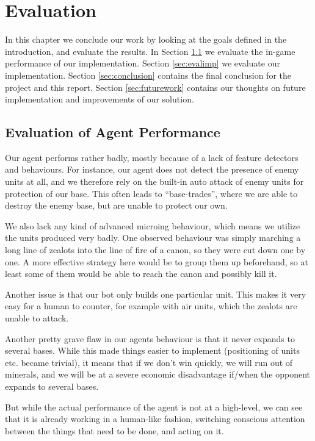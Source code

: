 
\chapter{Evaluation}
In this chapter we conclude our work by looking at the goals defined in the introduction, and evaluate the results.
In Section \ref{sec:evalperf} we evaluate the in-game performance of our implementation.
Section \ref{sec:evalimp} we evaluate our implementation.
Section \ref{sec:conclusion} contains the final conclusion for the project and this report.
Section \ref{sec:futurework} contains our thoughts on future implementation and improvements of our solution.


\section{Evaluation of Agent Performance}
\label{sec:evalperf}
Our agent performs rather badly, mostly because of a lack of feature detectors and behaviours. For instance, our agent does not detect the presence of enemy units at all, and we therefore rely on the built-in auto attack of enemy units for protection of our base. This often leads to ``base-trades'', where we are able to destroy the enemy base, but are unable to protect our own.

We also lack any kind of advanced microing behaviour, which means we utilize the units produced very badly. One observed behaviour was simply marching a long line of zealots into the line of fire of a canon, so they were cut down one by one. A more effective strategy here would be to group them up beforehand, so at least some of them would be able to reach the canon and possibly kill it.

Another issue is that our bot only builds one particular unit. This makes it very easy for a human to counter, for example with air units, which the zealots are unable to attack.

Another pretty grave flaw in our agents behaviour is that it never expands to several bases. While this made things easier to implement (positioning of units etc. became trivial), it means that if we don't win quickly, we will run out of minerals, and we will be at a severe economic disadvantage if/when the opponent expands to several bases.

But while the actual performance of the agent is not at a high-level, we can see that it is already working in a human-like fashion, switching conscious attention between the things that need to be done, and acting on it.

